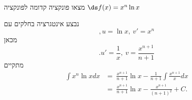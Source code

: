 מצאו פונקציה קדומה לפונקציה
$\ds f(x)=x^{n}\ln x$
\begin{solbox}
נבצע אינטגרציה בחלקים עם $$,u=\ln x,\ v'=x^n$$
מכאן
$$.u'=\frac{1}{x},\ v=\frac{x^{n+1}}{n+1}$$
מתקיים
\begin{align*}
    \int x^{n}\ln xdx&=\ \frac{x^{n+1}}{n+1}\ln x-\frac{1}{n+1}\int\frac{x^{n+1}}{x}dx\\
    &=\ \frac{x^{n+1}}{n+1}\ln x-\frac{x^{n+1}}{(n+1)^2}+C.
\end{align*}
\end{solbox}
